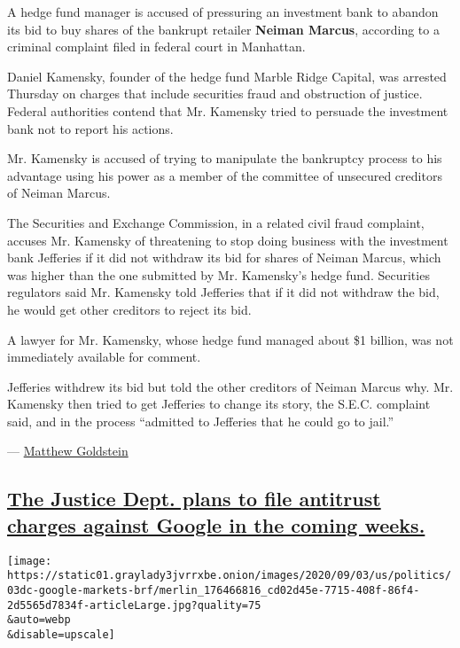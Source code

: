 A hedge fund manager is accused of pressuring an investment bank to
abandon its bid to buy shares of the bankrupt retailer \textbf{Neiman
Marcus}, according to a criminal complaint filed in federal court in
Manhattan.

Daniel Kamensky, founder of the hedge fund Marble Ridge Capital, was
arrested Thursday on charges that include securities fraud and
obstruction of justice. Federal authorities contend that Mr. Kamensky
tried to persuade the investment bank not to report his actions.

Mr. Kamensky is accused of trying to manipulate the bankruptcy process
to his advantage using his power as a member of the committee of
unsecured creditors of Neiman Marcus.

The Securities and Exchange Commission, in a related civil fraud
complaint, accuses Mr. Kamensky of threatening to stop doing business
with the investment bank Jefferies if it did not withdraw its bid for
shares of Neiman Marcus, which was higher than the one submitted by Mr.
Kamensky's hedge fund. Securities regulators said Mr. Kamensky told
Jefferies that if it did not withdraw the bid, he would get other
creditors to reject its bid.

A lawyer for Mr. Kamensky, whose hedge fund managed about \$1 billion,
was not immediately available for comment.

Jefferies withdrew its bid but told the other creditors of Neiman Marcus
why. Mr. Kamensky then tried to get Jefferies to change its story, the
S.E.C. complaint said, and in the process ``admitted to Jefferies that
he could go to jail.''

---
\href{https://www.nytimes3xbfgragh.onion/by/matthew-goldstein}{Matthew
Goldstein}

\hypertarget{the-justice-dept-plans-to-file-antitrust-charges-against-google-in-the-coming-weeks}{%
\subsection{\texorpdfstring{\protect\hyperlink{the-justice-dept-plans-to-file-antitrust-charges-against-google-in-the-coming-weeks}{The
Justice Dept. plans to file antitrust charges against Google in the
coming
weeks.}}{The Justice Dept. plans to file antitrust charges against Google in the coming weeks.}}\label{the-justice-dept-plans-to-file-antitrust-charges-against-google-in-the-coming-weeks}}

\texttt{[image: https://static01.graylady3jvrrxbe.onion/images/2020/09/03/us/politics/03dc-google-markets-brf/merlin\_176466816\_cd02d45e-7715-408f-86f4-2d5565d7834f-articleLarge.jpg?quality=75\\\&auto=webp\\\&disable=upscale]}

